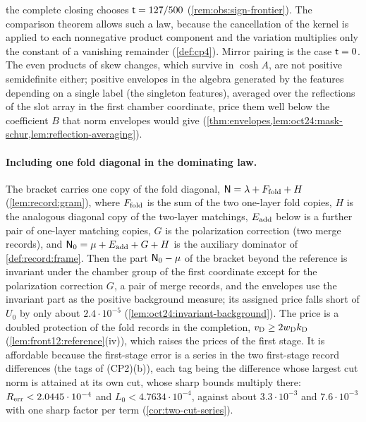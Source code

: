 the complete closing chooses $\mathsf t=127/500$ (\cref{rem:obs:sign-frontier}).
The comparison theorem allows such a law,
because the cancellation of the kernel is applied to each nonnegative product
component and the variation multiplies only the constant of a vanishing
remainder (\cref{def:cp4}). Mirror pairing is the case $\mathsf t=0$. The even
products of skew changes, which survive in $\cosh A$, are not positive
semidefinite either; positive envelopes in the algebra generated by the features
depending on a single label (the singleton features), averaged
over the reflections of the slot array in the first chamber
coordinate, price them well below the coefficient
$B$ that norm envelopes would give
(\cref{thm:envelopes,lem:oct24:mask-schur,lem:reflection-averaging}).

\paragraph{Including one fold diagonal in the dominating law.}
The bracket carries one copy of the fold diagonal,
$\mathsf N=\lambda+F_{\rm fold}+H$ (\cref{lem:record:gram}), where
$F_{\rm fold}$ is the sum of the two one-layer fold copies, $H$ is
the analogous diagonal copy of the two-layer matchings, $E_{\rm add}$
below is a further pair of one-layer matching copies, $G$ is the
polarization correction (two merge records), and
$\mathsf N_0=\mu+E_{\rm add}+G+H$ is the auxiliary dominator of
\cref{def:record:frame}. Then the part $\mathsf N_0-\mu$ of the bracket
beyond the reference is invariant
under the chamber group of the first coordinate except for the polarization
correction $G$, a pair of
merge records, and the envelopes use the invariant part as the
positive background measure; its assigned price falls short of
$U_0$ by only about $2.4\cdot10^{-5}$
(\cref{lem:oct24:invariant-background}).
The price is a doubled protection of the fold records in the completion,
$v_{\rm D}\ge2w_{\rm D}k_{\rm D}$ (\cref{lem:front12:reference}(iv)), which
raises the prices of the first stage. It is affordable because the
first-stage error is a series in the two first-stage record
differences (the tags of (CP2)(b)), each tag being the difference
whose largest cut norm is attained at its own cut, whose sharp
bounds multiply there:
$R_{\rm err}<2.0445\cdot10^{-4}$ and $L_0<4.7634\cdot10^{-4}$, against about
$3.3\cdot10^{-3}$ and $7.6\cdot10^{-3}$ with one sharp factor per term
(\cref{cor:two-cut-series}).

